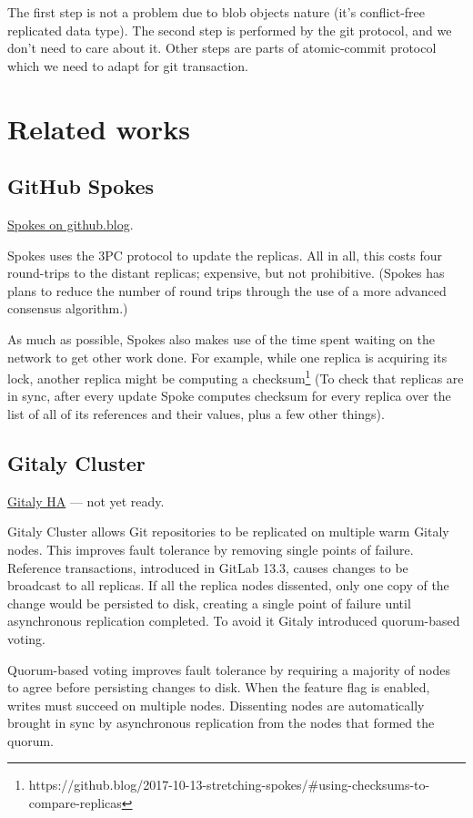 \documentclass[sigplan, screen, nonacm, 11pt]{acmart}
\begin{document}
The first step is not a problem due to blob objects nature (it's conflict-free replicated data type).
The second step is performed by the git protocol, and we don't need to care about it.
Other steps are parts of atomic-commit protocol which we need to adapt for git transaction.

\section{Related works}

\subsection{GitHub Spokes}

\href{https://github.blog/2017-10-13-stretching-spokes/}{Spokes on github.blog}.

Spokes uses the 3PC protocol to update the replicas.
All in all, this costs four round-trips to the distant replicas;
expensive, but not prohibitive.
(Spokes has plans to reduce the number of round trips through the use of a more advanced consensus algorithm.)

As much as possible, Spokes also makes use of the time spent waiting on the network to get other work done.
For example, while one replica is acquiring its lock,
another replica might be computing a checksum\footnote{https://github.blog/2017-10-13-stretching-spokes/\#using-checksums-to-compare-replicas} (To check that replicas are in sync, after every update Spoke computes checksum for every replica over the list of all of its references and their values, plus a few other things).

\subsection{Gitaly Cluster}

\href{https://gitlab.com/groups/gitlab-org/-/epics/1189}{Gitaly HA} --- not yet ready.

Gitaly Cluster allows Git repositories to be replicated on multiple warm Gitaly nodes.
This improves fault tolerance by removing single points of failure.
Reference transactions, introduced in GitLab 13.3,
causes changes to be broadcast to all replicas.
If all the replica nodes dissented, only one copy of the change would be persisted to disk,
creating a single point of failure until asynchronous replication completed.
To avoid it Gitaly introduced quorum-based voting.

Quorum-based voting improves fault tolerance by requiring a majority of nodes to agree before persisting changes to disk.
When the feature flag is enabled, writes must succeed on multiple nodes.
Dissenting nodes are automatically brought in sync by asynchronous replication from the nodes that formed the quorum.
\end{document}
